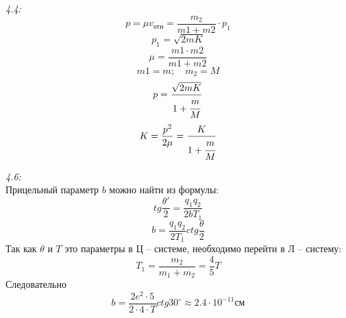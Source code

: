 	\emph{4.4:}\\
		\[ p = \mu v_\text{отн} = \frac{m_2}{m1+m2}\cdot p_1 \]
		\[ p_1 = \sqrt{2mK} \]
		\[ \mu = \frac{m1\cdot m2}{m1+m2} \]
		\[ m1 = m;\quad m_2 = M \]
		\[ p = \frac{\sqrt{2mK}}{1+\cfrac{m}{M}} \]
		\[ K = \frac{p^2}{2\mu} = \frac{K}{1+\cfrac{m}{M}} \]

	\emph{4.6:}\\
	Прицельный параметр \( b \) можно найти из формулы:
		\[ tg\frac{\theta'}{2} = \frac{q_1 q_2}{2bT_1} \]
		\[ b = \frac{q_1 q_2}{2T_1}ctg\frac{\theta}{2} \]
	Так как \( \theta \) и \( T \) это параметры в Ц -- системе, 
	необходимо перейти в Л -- систему:
		\[ T_1 = \frac{m_2}{m_1 + m_2} = \frac{4}{5}T \]
	Следовательно
		\[ 
			b = \frac{2e^2\cdot 5}{2\cdot 4\cdot T}ctg{30^\circ} 
			\approx 2.4\cdot 10^{-11} \text{см} 
		\]


